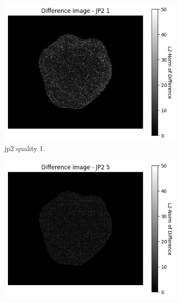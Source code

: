 \begin{figure}[htb]
    \centering
        \begin{subfigure}[b]{0.49\textwidth}
            \centering
            \includegraphics[width=\textwidth]{doc/thesis/0_figures/compare_quality/set1/jp2_1_diff_heatmap.png}
            \caption{\gls{jp2} quality 1.}
            \label{fig:img_quality_heatmap_1}
        \end{subfigure}
        \begin{subfigure}[b]{0.49\textwidth}
            \centering
            \includegraphics[width=\textwidth]{doc/thesis/0_figures/compare_quality/set1/jp2_5_diff_heatmap.png}

\end{subfigure}
\end{figure}
